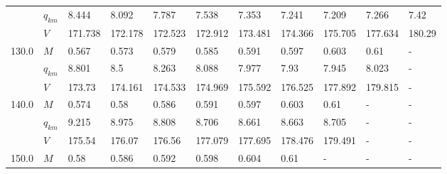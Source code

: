 \begin{tabular}{|l|l|lllllllll|}
      & $q_{km}$ &                     8.444 &                     8.092 &                     7.787 &                     7.538 &                     7.353 &                     7.241 &    7.209\cellcolor{green} &                     7.266 &                      7.42 \\
      & $V$ &                   171.738 &                   172.178 &                   172.523 &                   172.912 &                   173.481 &                   174.366 &  175.705\cellcolor{green} &                   177.634 &                    180.29 \\
\hline
130.0 & $M$ &                     0.567 &                     0.573 &                     0.579 &                     0.585 &                     0.591 &    0.597\cellcolor{green} &                     0.603 &                      0.61 &                         - \\
      & $q_{km}$ &                     8.801 &                       8.5 &                     8.263 &                     8.088 &                     7.977 &     7.93\cellcolor{green} &                     7.945 &                     8.023 &                         - \\
      & $V$ &                    173.73 &                   174.161 &                   174.533 &                   174.969 &                   175.592 &  176.525\cellcolor{green} &                   177.892 &                   179.815 &                         - \\
\hline
140.0 & $M$ &                     0.574 &                      0.58 &                     0.586 &                     0.591 &    0.597\cellcolor{green} &                     0.603 &                      0.61 &                         - &                         - \\
      & $q_{km}$ &                     9.215 &                     8.975 &                     8.808 &                     8.706 &    8.661\cellcolor{green} &                     8.663 &                     8.705 &                         - &                         - \\
      & $V$ &                    175.54 &                    176.07 &                    176.56 &                   177.079 &  177.695\cellcolor{green} &                   178.476 &                   179.491 &                         - &                         - \\
\hline
150.0 & $M$ &                      0.58 &                     0.586 &                     0.592 &    0.598\cellcolor{green} &                     0.604 &                      0.61 &                         - &                         - &                         - \\

\end{tabular}
